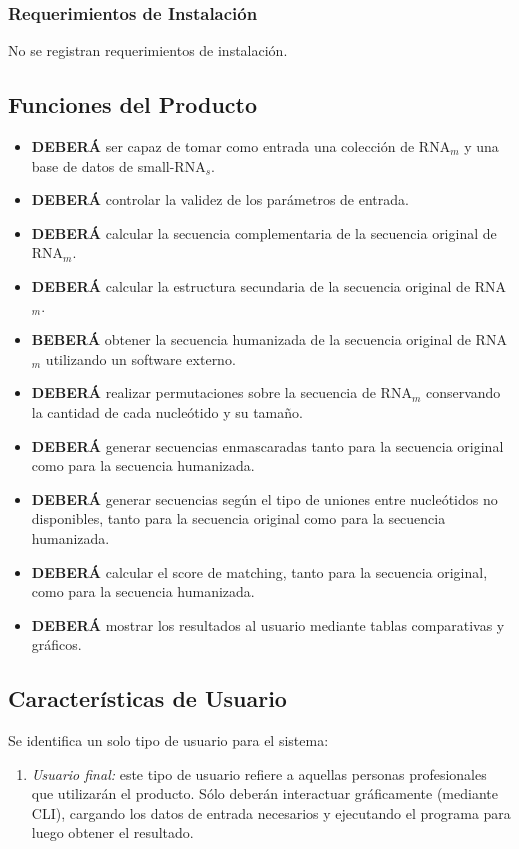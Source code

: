 \documentclass[12pt,a4paper,spanish]{article}
\begin{document}
	\subsubsection{Requerimientos de Instalación}
		No se registran requerimientos de instalación.

\subsection{Funciones del Producto}
	\begin{itemize}
		\item \textbf{DEBERÁ} ser capaz de tomar como entrada una colección de RNA$_m$ y una base de datos de small-RNA$_s$. 
		\item \textbf{DEBERÁ} controlar la validez de los parámetros de entrada.
		\item \textbf{DEBERÁ} calcular la secuencia complementaria de la secuencia original de RNA$_m$.
		\item \textbf{DEBERÁ} calcular la estructura secundaria de la secuencia original de RNA$_m$.
		\item \textbf{BEBERÁ} obtener la secuencia humanizada de la secuencia original de RNA$_m$ utilizando un software 									externo.
		\item \textbf{DEBERÁ} realizar permutaciones sobre la secuencia de RNA$_m$ conservando la cantidad de cada 									nucleótido y su tamaño.
		\item \textbf{DEBERÁ} generar secuencias enmascaradas tanto para la secuencia original como para la secuencia 								  humanizada.

		\item \textbf{DEBERÁ} generar secuencias según el tipo de uniones entre nucleótidos no disponibles, tanto para la 								secuencia original como para la secuencia humanizada.

		\item \textbf{DEBERÁ} calcular el score de matching, tanto para la secuencia original, como para la secuencia 								humanizada.	

		\item \textbf{DEBERÁ} mostrar los resultados al usuario mediante tablas comparativas y gráficos.		
	\end{itemize}

\subsection{Características de Usuario}
	Se identifica un solo tipo de usuario para el sistema:
	\begin{enumerate}
 		\item \textit{Usuario final:} este tipo de usuario refiere a aquellas personas profesionales que utilizarán el 										producto. Sólo deberán interactuar gráficamente (mediante CLI), cargando los datos de 										entrada necesarios y ejecutando el programa para luego obtener el resultado. 
	\end{enumerate}
\end{document}
